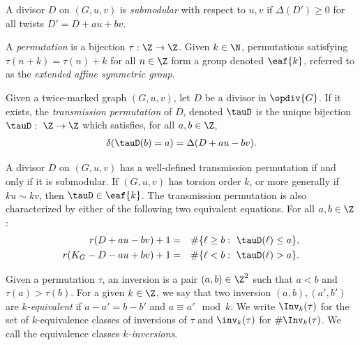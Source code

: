 \begin{defi}\label{def-submod}
A divisor $D$ on $(G,u,v)$ is \textit{submodular} with respect to $u,v$ if $\Delta(D')\geq 0$ for all twists $D' = D+au + bv$.
\end{defi}

\begin{defi}\label{def-EA}
    A \textit{permutation} is a bijection $\tau:\Z\to \Z$. Given $k\in \N$, permutations satisfying $\tau(n+k)= \tau(n) + k$ for all $n \in \Z$ form a group denoted $\eaf{k}$, referred to as the \textit{extended affine symmetric group}.
\end{defi}

\begin{defi}\label{def-tauD}
    Given a twice-marked graph $(G,u,v)$, let $D$ be a divisor in $\opdiv{G}$. If it exists, the \emph{transmission permutation} of $D$, denoted $\tauD$ is the unique bijection $\tauD:\ \Z \to \Z$ which satisfies, for all $a,b \in \Z$,
    \begin{align*}
        \delta(\tauD(b) = a) = \Delta(D+au-bv).
    \end{align*}
\end{defi}

\begin{lemma} \label{lem:tauChars} 
A divisor $D$ on $(G,u,v)$ has a well-defined transmission permutation if and only if it is submodular. If $(G,u,v)$ has torsion order $k$, or more generally if $ku \sim k v$, then $\tauD \in \eaf{k}$. The transmission permutation is also characterized by either of the following two equivalent equations. For all $a,b \in \Z$:
\begin{eqnarray*}
r(D + au - bv) + 1 &=& \# \{ \ell \geq b:\ \tauD(\ell) \leq a \},\\
r(K_G - D - au + bv) + 1 &=& \# \{ \ell < b:\ \tauD(\ell) >a \}.
\end{eqnarray*}
\end{lemma}

\begin{defi}\label{def-inv}
    Given a permutation $\tau$, an inversion is a pair $(a,b) \in \Z^2$ such that $a<b$ and $\tau(a)>\tau(b)$. For a given $k \in \Z$, we say that two inversion $(a,b),(a',b')$ are $k$\textit{-equivalent} if $a-a' = b-b'$ and $a \equiv a' \mod k$. We write $\Inv_k(\tau)$ for the set of $k$-equivalence classes of inversions of $\tau$ and $\inv_k(\tau)$ for $\# \Inv_k(\tau)$. We call the equivalence classes \textit{$k$-inversions}.
\end{defi}

